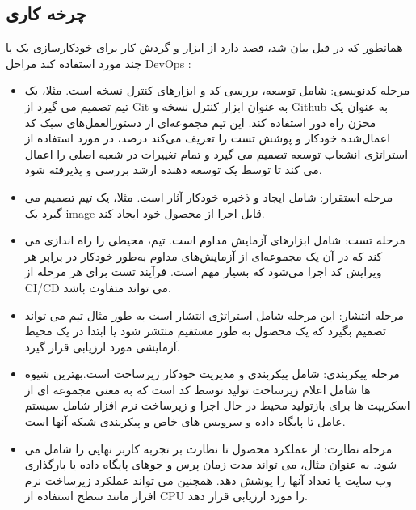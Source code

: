 \subsection{چرخه کاری }
همانطور که در قبل بیان شد،
قصد دارد از ابزار و گردش کار برای خودکارسازی یک یا چند مورد استفاده کند مراحل DevOps : 
\begin{itemize}
	\item
مرحله کدنویسی: شامل توسعه، بررسی کد و ابزارهای کنترل نسخه است. مثلا، یک تیم تصمیم می گیرد از Git به عنوان ابزار کنترل نسخه و Github به عنوان یک مخزن راه دور استفاده کند. این تیم مجموعه‌ای از دستورالعمل‌های سبک کد اعمال‌شده خودکار و پوشش تست را تعریف می‌کند درصد، در مورد استفاده از استراتژی انشعاب توسعه تصمیم می گیرد و تمام تغییرات در شعبه اصلی را اعمال می کند تا توسط یک توسعه دهنده ارشد بررسی و پذیرفته شود.
	\item 
مرحله استقرار: شامل ایجاد و ذخیره خودکار آثار است. مثلا، یک تیم تصمیم می گیرد یک image قابل اجرا از محصول خود ایجاد کند.
	\item 
مرحله تست: شامل ابزارهای آزمایش مداوم است. تیم، محیطی را راه اندازی می کند که در آن یک مجموعه‌ای از آزمایش‌های مداوم به‌طور خودکار در برابر هر ویرایش کد اجرا می‌شود که بسیار مهم است. فرآیند تست برای هر مرحله از CI/CD می تواند متفاوت باشد.
	\item 
مرحله انتشار: این مرحله شامل استراتژی انتشار است به طور مثال تیم می تواند تصمیم بگیرد که یک محصول به طور مستقیم منتشر شود یا ابتدا در یک محیط آزمایشی مورد ارزیابی قرار گیرد.
	\item 
مرحله پیکربندی: شامل پیکربندی و مدیریت خودکار زیرساخت است.بهترین شیوه ها شامل اعلام زیرساخت تولید توسط کد است که به معنی مجموعه ای از اسکریپت ها برای بازتولید محیط در حال اجرا و زیرساخت نرم افزار شامل سیستم عامل تا پایگاه داده  و سرویس های خاص و پیکربندی شبکه آنها است.
	\item 
مرحله نظارت: از عملکرد محصول تا نظارت بر تجربه کاربر نهایی را شامل می شود. به عنوان مثال، می تواند مدت زمان پرس و جوهای پایگاه داده یا بارگذاری وب سایت یا تعداد آنها را پوشش دهد. همچنین می تواند عملکرد زیرساخت نرم افزار مانند سطح استفاده از CPU را مورد ارزیابی قرار دهد.
\end{itemize}
